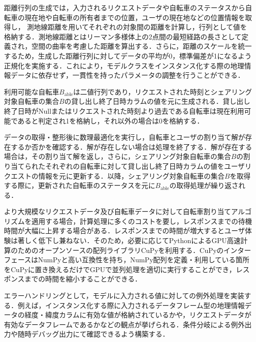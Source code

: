           \par 距離行列の生成では，入力されるリクエストデータや自転車のステータスから自転車の現在地や自転車の所有者までの位置，ユーザの現在地などの位置情報を取得し， 測地線距離を用いてそれぞれの対象間の距離を計算し，行列として値を格納する．測地線距離とはリーマン多様体上の2点間の最短経路の長さとして定義され，空間の曲率を考慮した距離を算出する．さらに，距離のスケールを統一するため，生成した距離行列に対してデータの平均が0，標準偏差が1になるよう正規化を実施する．これにより，モデルクラスをインスタンス化する際の地理情報データに依存せず，一貫性を持ったパラメータの調整を行うことができる．
          \par 利用可能な自転車$B_{\text{able}}$は二値行列であり，リクエストされた時刻とシェアリング対象自転車の集合$B$の貸し出し終了日時カラムの値を元に生成される．貸し出し終了日時がNullまたはリクエストされた時刻より過去である自転車は現在利用可能であると判定され1を格納し，それ以外の場合は0を格納する．
          \par データの取得・整形後に数理最適化を実行し，自転車とユーザの割り当て解が存在するか否かを確認する．解が存在しない場合は処理を終了する．解が存在する場合は，その割り当て解を返し，さらに，シェアリング対象自転車の集合$B$の割り当てられたそれぞれの自転車に対して貸し出し終了日時カラムの値をユーザリクエストの情報を元に更新する．以降，シェアリング対象自転車の集合$B$を取得する際に，更新された自転車のステータスを元に$B_{\text{able}}$の取得処理が繰り返される．
          \par より大規模なリクエストデータ及び自転車データに対して自転車割り当てアルゴリズムを適用する場合，計算処理に多くのコストを要し，レスポンスまでの待機時間が大幅に上昇する場合がある．レスポンスまでの時間が増大するとユーザ体験は著しく低下し兼ねない．そのため，必要に応じてPythonによるGPU高速計算のためのオープンソースの配列ライブラリCuPyを利用する．CuPyのインターフェースはNumPyと高い互換性を持ち，NumPy配列を定義・利用している箇所をCuPyに置き換えるだけでGPUで並列処理を適切に実行することができ，レスポンスまでの時間を縮小することができる．
          \par エラーハンドリングとして，モデルに入力される値に対しての例外処理を実装する．例えば，インスタンス化する際に入力されるデータフレーム型の地理情報データの経度・緯度カラムに有効な値が格納されているかや，リクエストデータが有効なデータフレームであるかなどの観点が挙げられる．条件分岐による例外出力や随時デバッグ出力にて確認できるよう構築する．

